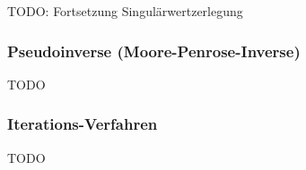TODO: Fortsetzung Singulärwertzerlegung

\subsubsection{Pseudoinverse (Moore-Penrose-Inverse)}

TODO

\subsubsection{Iterations-Verfahren}


TODO
